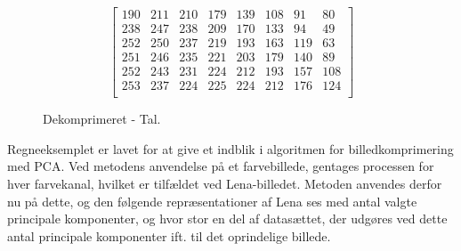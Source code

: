 \begin{figure}[!h]
\begin{minipage}[b]{0.45\linewidth}
\[\begin{bmatrix}
190 & 211 & 210 & 179 & 139 & 108 &  91 &  80 \\
238 & 247 & 238 & 209 & 170 & 133 &  94 &  49 \\
252 & 250 & 237 & 219 & 193 & 163 & 119 &  63 \\
251 & 246 & 235 & 221 & 203 & 179 & 140 &  89 \\
252 & 243 & 231 & 224 & 212 & 193 & 157 & 108 \\
253 & 237 & 224 & 225 & 224 & 212 & 176 & 124 \\
\end{bmatrix}\]
\caption{Dekomprimeret - Tal.}
\label{fig:X_anvendelse-tal-slut1}
\end{minipage}
\end{figure}

Regneeksemplet er lavet for at give et indblik i algoritmen for billedkomprimering med PCA. Ved metodens anvendelse på et farvebillede, gentages processen for hver farvekanal, hvilket er tilfældet ved Lena-billedet. Metoden anvendes derfor nu på dette, og den følgende repræsentationer af Lena ses med antal valgte principale komponenter, og hvor stor en del af datasættet, der udgøres ved dette antal principale komponenter ift. til det oprindelige billede.
